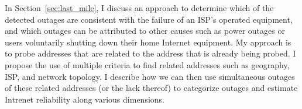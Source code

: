 In Section~\ref{sec:last_mile}, I discuss an approach to determine
which of the detected outages are consistent with the failure of an
ISP's operated equipment, and which outages can be attributed to other
causes such as power outages or users voluntarily shutting down their home
Internet equipment. My approach is to probe addresses that are related
to the address that is already being probed. I propose the use of multiple criteria
to find related addresses such as geography, ISP, and network
topology. I describe how we can then use simultaneous outages of these
related addresses (or the lack thereof) to categorize outages and
estimate Intrenet reliability along various dimensions.








